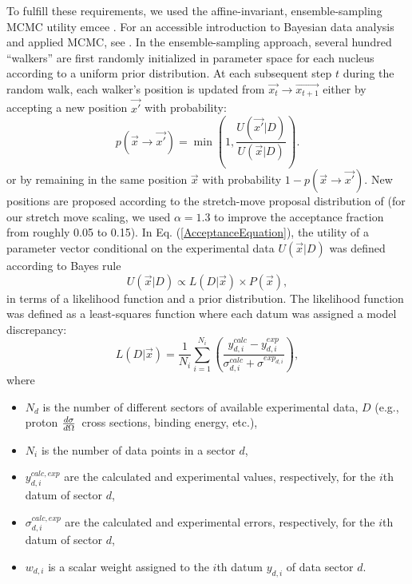 \documentclass[twocolumn,secnumarabic,amssymb, nobibnotes, aps, prl,
superscriptaddress, nobalancelastpage, draft]{revtex4}
\newcommand{\el}{\ensuremath{\frac{\lowercase{d}\sigma}{\lowercase{d}\Omega}}}
\begin{document}
To fulfill these requirements, we used the affine-invariant, ensemble-sampling
MCMC utility emcee \cite{Foreman-Mackey2013}. For an
accessible introduction to Bayesian data analysis and applied MCMC, see
\cite{Sharma2017}. In the ensemble-sampling approach, several hundred
``walkers'' are first randomly initialized in parameter space for each nucleus according to a
uniform prior distribution. At each subsequent step $t$ during the
random walk, each walker's position is updated from $\vec{x_{t}} \rightarrow
\vec{x_{t+1}}$ either by accepting a new position $\vec{x'}$ with probability:
\begin{equation}\label{AcceptanceEquation}
    p(\vec{x}\rightarrow \vec{x'}) = \min(1,\frac{U(\vec{x'}|D)}{U(\vec{x}|D)}).
\end{equation}
or by remaining in the same position $\vec{x}$ with probability
$1-p(\vec{x}\rightarrow \vec{x'})$. New positions are proposed according
to the stretch-move proposal distribution of \cite{Goodman2010} (for our stretch
move scaling, we used $\alpha = 1.3$ to improve the acceptance fraction from
roughly 0.05 to 0.15). In Eq.
(\ref{AcceptanceEquation}), the utility of a parameter vector conditional on the
experimental data $U(\vec{x}|D)$ was defined according to Bayes rule
\begin{equation}
    U(\vec{x}|D) \propto L(D|\vec{x}) \times P(\vec{x}),
\end{equation}
in terms of a likelihood function and a prior distribution. The likelihood
function was defined as a least-squares function where each datum was assigned
a model discrepancy:
\begin{equation} \label{LikelihoodFunction}
    L(D|\vec{x}) = \frac{1}{N_{i}} \sum_{i=1}^{N_{i}}
    \left(\frac{y^{calc}_{d,i}-y^{exp}_{d,i}}{\sigma^{calc}_{d,i}+\sigma^{exp_{d,i}}}\right),
\end{equation}
where
\begin{itemize}
    \item $N_{d}$ is the number of different sectors of available experimental
        data, $D$ (e.g., proton \el\ cross sections,
binding energy, etc.),
    \item $N_{i}$ is the number of data points in a sector $d$,
    \item $y^{calc, exp}_{d,i}$ are the calculated and experimental values,
        respectively, for the $i$th datum of sector $d$,
    \item $\sigma^{calc, exp}_{d,i}$ are the calculated and experimental errors,
        respectively, for the $i$th datum of sector $d$,
    \item $w_{d,i}$ is a scalar weight assigned to the $i$th datum
        $y_{d,i}$ of data sector $d$.
\end{itemize}
\end{document}
